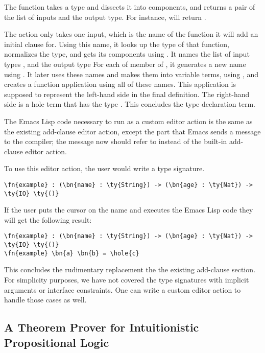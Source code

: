 The  function takes a type and dissects it into components, and returns
a pair of the list of inputs and the output type. For instance,
will return .

The  action only takes one input, which is the name of the function
it will add an initial clause for.
Using this name, it looks up the type of that function,
normalizes the type, and gets its components
using .
It names the list of input types , and the output type 
For each of member of , it generates a new name using
. It later uses these names and makes them
into variable terms, using , and creates a function application using
all of these names. This application is supposed to represent the left-hand
side in the final definition. The right-hand side is a hole term that has the
type . This concludes the type declaration term.

The Emacs Lisp code necessary to run  as a custom editor action
is the same as the existing add-clause editor action, except the part that
Emacs sends a message to the compiler; the message now should refer to
 instead of the built-in add-clause editor action.

To use this editor action, the user would write a type signature.

\begin{Verbatim}
\fn{example} : (\bn{name} : \ty{String}) -> (\bn{age} : \ty{Nat}) -> \ty{IO} \ty{()}
\end{Verbatim}

If the user puts the cursor on the name  and executes the Emacs
Lisp code they will get the following result:

\begin{Verbatim}
\fn{example} : (\bn{name} : \ty{String}) -> (\bn{age} : \ty{Nat}) -> \ty{IO} \ty{()}
\fn{example} \bn{a} \bn{b} = \hole{c}
\end{Verbatim}

This concludes the rudimentary replacement the the existing add-clause section.
For simplicity purposes, we have not covered the type signatures with implicit
arguments or interface constraints. One can write a custom editor action to
handle those cases as well.

\subsection{A Theorem Prover for Intuitionistic Propositional Logic}\label{sec:hezarfen}

